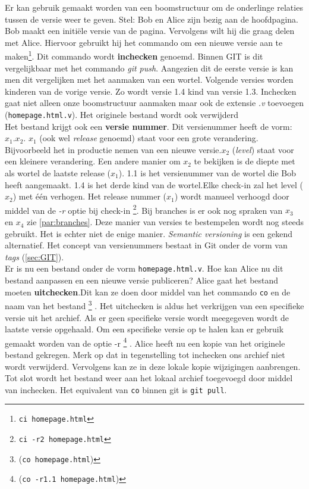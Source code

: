 Er kan gebruik gemaakt worden van een boomstructuur om de onderlinge relaties tussen de versie weer te geven. Stel: Bob en Alice zijn bezig aan de hoofdpagina. Bob maakt een initiële versie van de pagina. Vervolgens wilt hij die graag delen met Alice. Hiervoor gebruikt hij het commando om een nieuwe versie aan te maken\footnote{\Verb+ci homepage.html+}. Dit commando wordt \textbf{inchecken} genoemd. Binnen GIT is dit vergelijkbaar met het commando \textit{git push}. Aangezien dit de eerste versie is kan men dit vergelijken met het aanmaken van een wortel. Volgende versies worden kinderen van de vorige versie. Zo wordt versie 1.4 kind van versie 1.3. Inchecken gaat niet alleen onze boomstructuur aanmaken maar ook de extensie \textit{.v} toevoegen (\verb+homepage.html.v+). Het originele bestand wordt ook verwijderd\\

Het bestand krijgt ook een \textbf{versie nummer}. Dit versienummer heeft de vorm: $x_1.x_2$. $x_1$ (ook wel \textit{release} genoemd) staat voor een grote verandering. Bijvoorbeeld het in productie nemen van een nieuwe versie.$x_2$ (\textit{level}) staat voor een kleinere verandering. Een andere manier om $x_2$ te bekijken is de diepte met als wortel de laatste release ($x_1$). 1.1 is het versienummer van de wortel die Bob heeft aangemaakt. 1.4 is het derde kind van de wortel.Elke check-in zal het level ($x_2$) met één verhogen. Het release nummer ($x_1$) wordt manueel verhoogd door middel van de \textit{-r} optie bij check-in \footnote{\Verb+ci -r2 homepage.html+}. Bij branches is er ook nog spraken van $x_3$ en $x_4$ zie \ref{par:branches}. Deze manier van versies te bestempelen wordt nog steeds gebruikt. Het is echter niet de enige manier. \textit{Semantic versioning} is een gekend alternatief. Het concept van versienummers bestaat in Git onder de vorm van \textit{tags} (\ref{sec:GIT}).\\

Er is nu een bestand onder de vorm \verb+homepage.html.v+. Hoe kan Alice nu dit bestand aanpassen en een nieuwe versie publiceren? Alice gaat het bestand moeten \textbf{uitchecken}.Dit kan ze doen door middel van het commando \verb+co+ en de naam van het bestand \footnote{(\Verb+co homepage.html+)} . Het uitchecken is aldus het verkrijgen van een specifieke versie uit het archief. Als er geen specifieke versie wordt meegegeven wordt de laatste versie opgehaald. Om een specifieke versie op te halen kan er gebruik gemaakt worden van de optie -r  \footnote{(\Verb+co -r1.1 homepage.html+)} . Alice heeft nu een kopie van het originele bestand gekregen. Merk op dat in tegenstelling tot inchecken ons archief niet wordt verwijderd. Vervolgens kan ze in deze lokale kopie wijzigingen aanbrengen. Tot slot wordt het bestand weer aan het lokaal archief toegevoegd door middel van inchecken. Het equivalent van \verb+co+ binnen git is \verb+git pull+.\\

